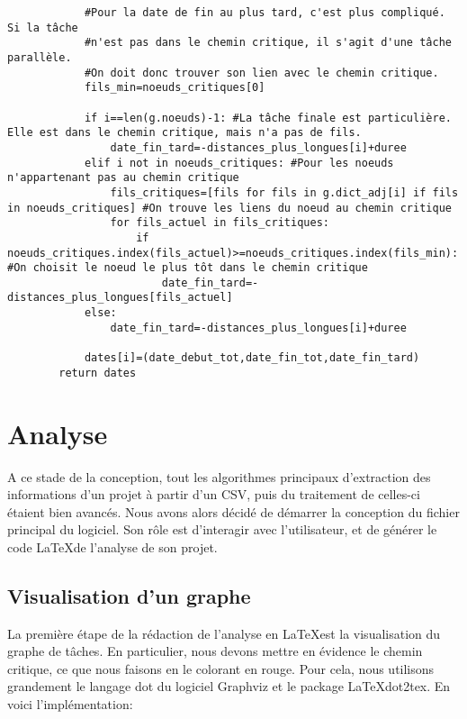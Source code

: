 \documentclass{article}
\begin{document}
\begin{verbatim}
            #Pour la date de fin au plus tard, c'est plus compliqué. Si la tâche
            #n'est pas dans le chemin critique, il s'agit d'une tâche parallèle.
            #On doit donc trouver son lien avec le chemin critique.
            fils_min=noeuds_critiques[0]
            
            if i==len(g.noeuds)-1: #La tâche finale est particulière. Elle est dans le chemin critique, mais n'a pas de fils.
                date_fin_tard=-distances_plus_longues[i]+duree
            elif i not in noeuds_critiques: #Pour les noeuds n'appartenant pas au chemin critique
                fils_critiques=[fils for fils in g.dict_adj[i] if fils in noeuds_critiques] #On trouve les liens du noeud au chemin critique
                for fils_actuel in fils_critiques: 
                    if noeuds_critiques.index(fils_actuel)>=noeuds_critiques.index(fils_min): #On choisit le noeud le plus tôt dans le chemin critique
                        date_fin_tard=-distances_plus_longues[fils_actuel]
            else:
                date_fin_tard=-distances_plus_longues[i]+duree
                    
            dates[i]=(date_debut_tot,date_fin_tot,date_fin_tard)
        return dates
\end{verbatim}
\section{Analyse}
A ce stade de la conception, tout les algorithmes principaux d'extraction
des informations d'un projet à partir d'un CSV, puis du traitement de celles-ci étaient bien avancés.
Nous avons alors décidé de démarrer la conception du fichier principal du logiciel.
Son rôle est d'interagir avec l'utilisateur, et de générer le code \LaTeX de l'analyse de son projet.

\subsection{Visualisation d'un graphe}
La première étape de la rédaction de l'analyse en \LaTeX \space est la visualisation du graphe de tâches.
En particulier, nous devons mettre en évidence le chemin critique, ce que nous faisons en le colorant en rouge.
Pour cela, nous utilisons grandement le langage dot du logiciel Graphviz et le package \LaTeX \space dot2tex.
En voici l'implémentation:
\end{document}
